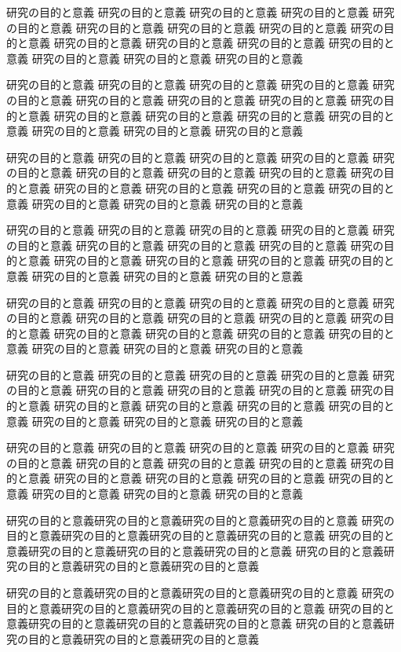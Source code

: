 \documentclass[12pt]{jarticle} %
\begin{document}
研究の目的と意義 研究の目的と意義 研究の目的と意義 研究の目的と意義 
研究の目的と意義 研究の目的と意義 研究の目的と意義 研究の目的と意義 
研究の目的と意義 研究の目的と意義 研究の目的と意義 研究の目的と意義 
研究の目的と意義 研究の目的と意義 研究の目的と意義 研究の目的と意義 

研究の目的と意義 研究の目的と意義 研究の目的と意義 研究の目的と意義 
研究の目的と意義 研究の目的と意義 研究の目的と意義 研究の目的と意義 
研究の目的と意義 研究の目的と意義 研究の目的と意義 研究の目的と意義 
研究の目的と意義 研究の目的と意義 研究の目的と意義 研究の目的と意義 

研究の目的と意義 研究の目的と意義 研究の目的と意義 研究の目的と意義 
研究の目的と意義 研究の目的と意義 研究の目的と意義 研究の目的と意義 
研究の目的と意義 研究の目的と意義 研究の目的と意義 研究の目的と意義 
研究の目的と意義 研究の目的と意義 研究の目的と意義 研究の目的と意義 

研究の目的と意義 研究の目的と意義 研究の目的と意義 研究の目的と意義 
研究の目的と意義 研究の目的と意義 研究の目的と意義 研究の目的と意義 
研究の目的と意義 研究の目的と意義 研究の目的と意義 研究の目的と意義 
研究の目的と意義 研究の目的と意義 研究の目的と意義 研究の目的と意義 

研究の目的と意義 研究の目的と意義 研究の目的と意義 研究の目的と意義 
研究の目的と意義 研究の目的と意義 研究の目的と意義 研究の目的と意義 
研究の目的と意義 研究の目的と意義 研究の目的と意義 研究の目的と意義 
研究の目的と意義 研究の目的と意義 研究の目的と意義 研究の目的と意義 

研究の目的と意義 研究の目的と意義 研究の目的と意義 研究の目的と意義 
研究の目的と意義 研究の目的と意義 研究の目的と意義 研究の目的と意義 
研究の目的と意義 研究の目的と意義 研究の目的と意義 研究の目的と意義 
研究の目的と意義 研究の目的と意義 研究の目的と意義 研究の目的と意義 

研究の目的と意義 研究の目的と意義 研究の目的と意義 研究の目的と意義 
研究の目的と意義 研究の目的と意義 研究の目的と意義 研究の目的と意義 
研究の目的と意義 研究の目的と意義 研究の目的と意義 研究の目的と意義 
研究の目的と意義 研究の目的と意義 研究の目的と意義 研究の目的と意義 

研究の目的と意義研究の目的と意義研究の目的と意義研究の目的と意義 
研究の目的と意義研究の目的と意義研究の目的と意義研究の目的と意義 
研究の目的と意義研究の目的と意義研究の目的と意義研究の目的と意義 
研究の目的と意義研究の目的と意義研究の目的と意義研究の目的と意義 

研究の目的と意義研究の目的と意義研究の目的と意義研究の目的と意義 
研究の目的と意義研究の目的と意義研究の目的と意義研究の目的と意義 
研究の目的と意義研究の目的と意義研究の目的と意義研究の目的と意義 
研究の目的と意義研究の目的と意義研究の目的と意義研究の目的と意義 
\end{document}

